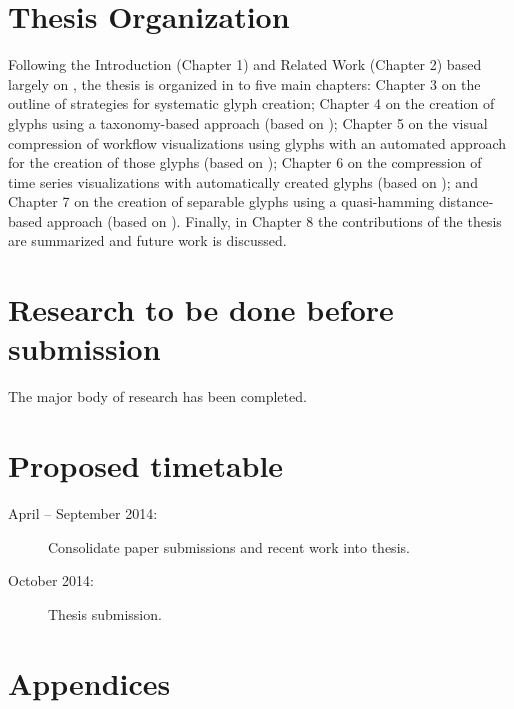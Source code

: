 \documentclass[a4paper]{article}
\begin{document}
\section*{Thesis Organization}
Following the Introduction (Chapter 1) and Related Work (Chapter 2) based largely on \cite{Borgo:2013:EG}, the thesis is organized in to five main chapters: Chapter 3 on the outline of strategies for systematic glyph creation; Chapter 4 on the creation of glyphs using a taxonomy-based approach (based on \cite{Maguire:2012:TVCG}); Chapter 5 on the visual compression of workflow visualizations using glyphs with an automated approach for the creation of those glyphs (based on \cite{maguire13}); Chapter 6 on the compression of time series visualizations with automatically created glyphs (based on \cite{maguire14}); and Chapter 7 on the creation of separable glyphs using a quasi-hamming distance-based approach (based on \cite{legg14}). Finally, in Chapter 8 the  contributions of the thesis are summarized and future work is discussed. \bigskip

\section*{Research to be done before submission}
The major body of research has been completed.
\bigskip


\section*{Proposed timetable}
\begin{description}
\item[April -- September 2014:] Consolidate paper submissions and recent work into thesis.
\item[October 2014:] Thesis submission.
\end{description}\bigskip

\clearpage
\section*{Appendices}
\end{document}
